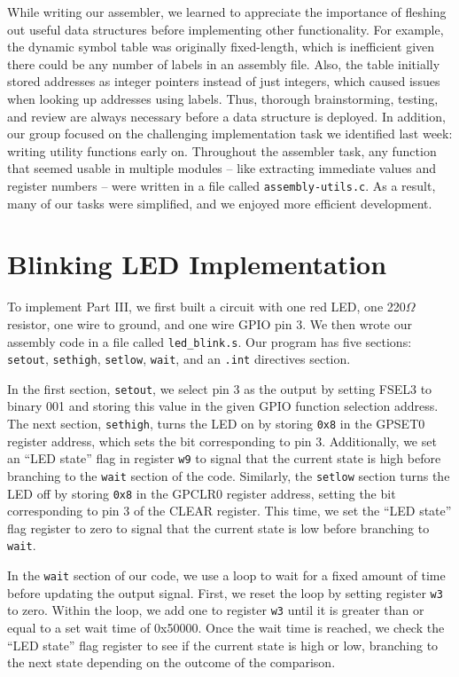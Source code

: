 \documentclass[11pt]{article}
\begin{document}
While writing our assembler, we learned to appreciate the importance of fleshing out 
useful data structures before implementing other functionality. For example, 
the dynamic symbol table was originally fixed-length, which is inefficient 
given there could be any number of labels in an assembly file. Also, the
table initially stored addresses as integer pointers instead of just integers, 
which caused issues when looking up addresses using labels. Thus, thorough brainstorming, 
testing, and review are always necessary before a data structure is deployed. 
In addition, our group focused on the challenging implementation task we identified 
last week: writing utility functions early on. Throughout the assembler task, 
any function that seemed usable in multiple modules -- like extracting immediate 
values and register numbers -- were written in a file called \texttt{assembly-utils.c}. 
As a result, many of our tasks were simplified, and we enjoyed more efficient development. 

\pagebreak

\section{Blinking LED Implementation}

To implement Part III, we first built a circuit with one red LED, 
one 220\(\Omega\) resistor, one wire to ground, and one wire GPIO pin 3. 
We then wrote our assembly code in a file called \texttt{led\_blink.s}. Our 
program has five sections: \texttt{setout}, \texttt{sethigh}, \texttt{setlow}, 
\texttt{wait}, and an \texttt{.int} directives section.

In the first section, \texttt{setout}, we select pin 3 as the output by setting FSEL3 
to binary 001 and storing this value in the given GPIO function selection address. The 
next section, \texttt{sethigh}, turns the LED on by storing \texttt{0x8} in the GPSET0 
register address, which sets the bit corresponding to pin 3. Additionally, we set an 
“LED state” flag in register \texttt{w9} to signal that the current state is high before 
branching to the \texttt{wait} section of the code. Similarly, the \texttt{setlow} 
section turns the LED off by storing \texttt{0x8}  in the GPCLR0 register address, 
setting the bit corresponding to pin 3 of the CLEAR register. This time, we set the 
“LED state” flag register to zero to signal that the current state is low before 
branching to \texttt{wait}.

In the \texttt{wait} section of our code, we use a loop to wait for a fixed amount 
of time before updating the output signal. First, we reset the loop by setting register 
\texttt{w3} to zero. Within the loop, we add one to register \texttt{w3} until it is greater 
than or equal to a set wait time of 0x50000. Once the wait time is reached, we check 
the “LED state” flag register to see if the current state is high or low, branching to 
the next state depending on the outcome of the comparison.
\end{document}

